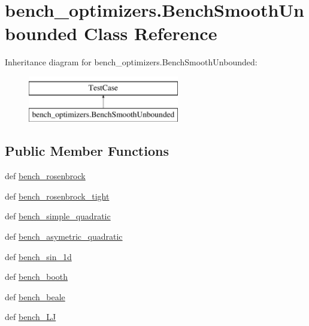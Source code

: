 \hypertarget{classbench__optimizers_1_1BenchSmoothUnbounded}{}\section{bench\+\_\+optimizers.\+Bench\+Smooth\+Unbounded Class Reference}
\label{classbench__optimizers_1_1BenchSmoothUnbounded}
Inheritance diagram for bench\+\_\+optimizers.\+Bench\+Smooth\+Unbounded\+:\begin{figure}[H]
\begin{center}
\leavevmode
\includegraphics[height=2.000000cm]{classbench__optimizers_1_1BenchSmoothUnbounded}
\end{center}
\end{figure}
\subsection*{Public Member Functions}
\begin{DoxyCompactItemize}
\item 
def \hyperlink{classbench__optimizers_1_1BenchSmoothUnbounded_a3c66c0fd7e3a1eb70ab3b7579ef5911f}{bench\+\_\+rosenbrock}
\item 
def \hyperlink{classbench__optimizers_1_1BenchSmoothUnbounded_a677d42218824d8e297f433303e118aeb}{bench\+\_\+rosenbrock\+\_\+tight}
\item 
def \hyperlink{classbench__optimizers_1_1BenchSmoothUnbounded_a9a96dbf214f119b988eeab33878c258e}{bench\+\_\+simple\+\_\+quadratic}
\item 
def \hyperlink{classbench__optimizers_1_1BenchSmoothUnbounded_ae28325743c8b8ca461b001ae0ab1a2d1}{bench\+\_\+asymetric\+\_\+quadratic}
\item 
def \hyperlink{classbench__optimizers_1_1BenchSmoothUnbounded_a9bcbe34b7d6fd8b834f4e925e31d8c48}{bench\+\_\+sin\+\_\+1d}
\item 
def \hyperlink{classbench__optimizers_1_1BenchSmoothUnbounded_af271575083e426b97b7d4887e8322038}{bench\+\_\+booth}
\item 
def \hyperlink{classbench__optimizers_1_1BenchSmoothUnbounded_a334558ce8eec8bd2185baba78391392c}{bench\+\_\+beale}
\item 
def \hyperlink{classbench__optimizers_1_1BenchSmoothUnbounded_a877d4b41248461e210e48ffaadcb3949}{bench\+\_\+\+L\+J}
\end{DoxyCompactItemize}
